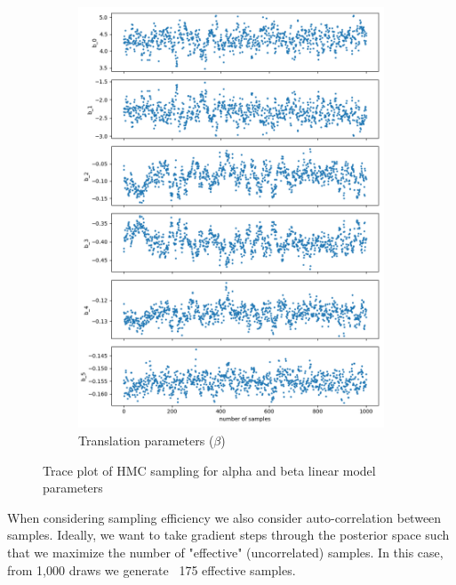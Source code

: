 \documentclass{article}
\begin{document}
\begin{figure}[H]
\begin{subfigure}[b]{0.49\linewidth}
            \includegraphics[width=\linewidth]{figs/bayes_beta_sampled_traceplot.png}
            \caption{Translation parameters ($\beta$)}
        \end{subfigure}
        \caption{Trace plot of HMC sampling for alpha and beta linear model parameters}
        \label{fig:bayestrace}
    \end{figure}

When considering sampling efficiency we also consider auto-correlation between samples. Ideally, we want to take gradient steps through the posterior space such that we maximize the number of "effective" (uncorrelated) samples. In this case, from 1,000 draws we generate ~175 effective samples.
\end{document}
